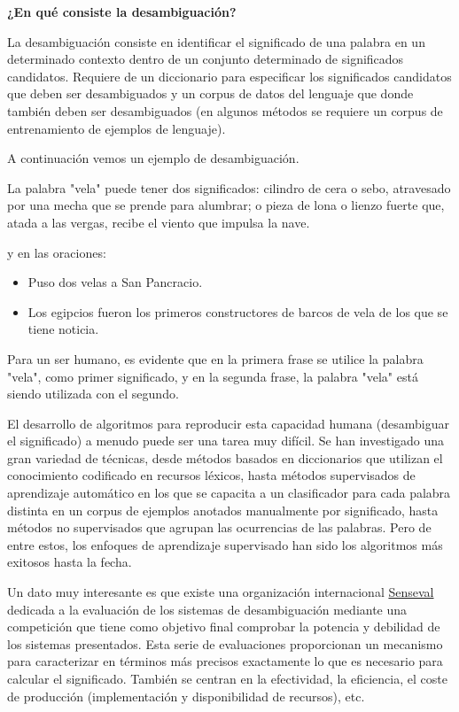 \documentclass[11pt]{exam}
\begin{document}
\begin{questions}
{\bf \question ¿En qué consiste la desambiguación?}

La desambiguación consiste en identificar el significado de una palabra en un determinado contexto dentro de un conjunto determinado de significados candidatos. Requiere de un diccionario para especificar los significados candidatos que deben ser desambiguados y un corpus de datos del lenguaje que donde también deben ser desambiguados (en algunos métodos se requiere un corpus de entrenamiento de ejemplos de lenguaje).

A continuación vemos un ejemplo de desambiguación. 

La palabra "vela" puede tener dos significados: cilindro de cera o sebo, atravesado por una mecha que se prende para alumbrar; o pieza de lona o lienzo fuerte que, atada a las vergas, recibe el viento que impulsa la nave.

y en las oraciones:

\begin{itemize}
	\item Puso dos velas a San Pancracio.
	\item Los egipcios fueron los primeros constructores de barcos de vela de los que se tiene noticia.
\end{itemize}

Para un ser humano, es evidente que en la primera frase se utilice la palabra "vela", como primer significado, y en la segunda frase, la palabra "vela" está siendo utilizada con el segundo. 

El desarrollo de algoritmos para reproducir esta capacidad humana (desambiguar el significado) a menudo puede ser una tarea muy difícil. Se han investigado una gran variedad de técnicas, desde métodos basados en diccionarios que utilizan el conocimiento codificado en recursos léxicos, hasta métodos supervisados de aprendizaje automático en los que se capacita a un clasificador para cada palabra distinta en un corpus de ejemplos anotados manualmente por significado, hasta métodos no supervisados que agrupan las ocurrencias de las palabras. Pero de entre estos, los enfoques de aprendizaje supervisado han sido los algoritmos más exitosos hasta la fecha.

Un dato muy interesante es que existe una organización internacional \href{http://www.senseval.org}{Senseval} dedicada a la evaluación de los sistemas de desambiguación mediante una competición que tiene como objetivo final comprobar la potencia y debilidad de los sistemas presentados. Esta serie de evaluaciones proporcionan un mecanismo para caracterizar en términos más precisos exactamente lo que es necesario para calcular el significado. También se centran en la efectividad, la eficiencia, el coste de producción (implementación y disponibilidad de recursos), etc. 


\end{questions}
\end{document}
